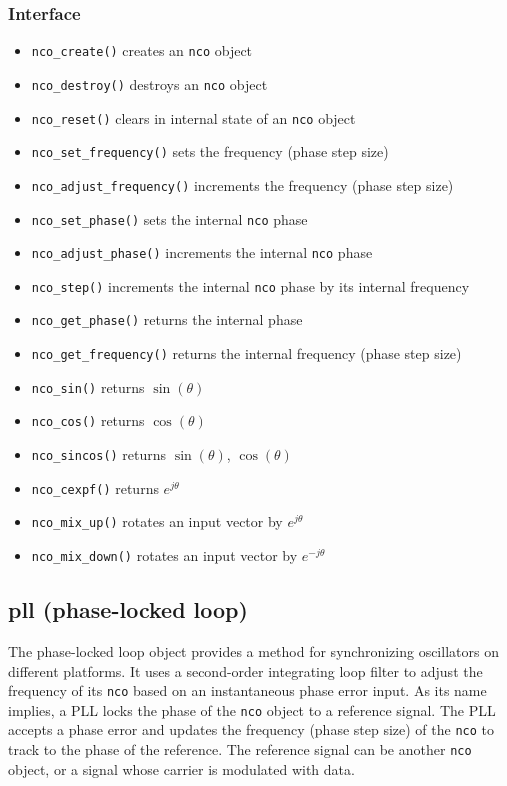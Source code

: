 \subsubsection{Interface}
\begin{itemize}
\item {\tt nco\_create()} creates an {\tt nco} object
\item {\tt nco\_destroy()} destroys an {\tt nco} object
\item {\tt nco\_reset()} clears in internal state of an {\tt nco} object
\item {\tt nco\_set\_frequency()} sets the frequency (phase step size)
\item {\tt nco\_adjust\_frequency()} increments the frequency (phase step size)
\item {\tt nco\_set\_phase()} sets the internal {\tt nco} phase
\item {\tt nco\_adjust\_phase()} increments the internal {\tt nco} phase
\item {\tt nco\_step()} increments the internal {\tt nco} phase by its
    internal frequency
\item {\tt nco\_get\_phase()} returns the internal phase
\item {\tt nco\_get\_frequency()} returns the internal frequency (phase step
    size)
\item {\tt nco\_sin()} returns $\sin(\theta)$
\item {\tt nco\_cos()} returns $\cos(\theta)$
\item {\tt nco\_sincos()} returns $\sin(\theta)$, $\cos(\theta)$
\item {\tt nco\_cexpf()} returns $e^{j\theta}$
\item {\tt nco\_mix\_up()} rotates an input vector by $e^{j\theta}$
\item {\tt nco\_mix\_down()} rotates an input vector by $e^{-j\theta}$
\end{itemize}

\subsection{{pll} (phase-locked loop)}
\label{module:nco:pll}
The phase-locked loop object provides a method for synchronizing oscillators
on different platforms.
It uses a second-order integrating loop filter to adjust the frequency of its
{\tt nco} based on an instantaneous phase error input.
As its name implies, a PLL locks the phase of the {\tt nco} object to a
reference signal.
The PLL accepts a phase error and updates the frequency (phase step size) of
the {\tt nco} to track to the phase of the reference.
The reference signal can be another {\tt nco} object, or a signal whose
carrier is modulated with data.

